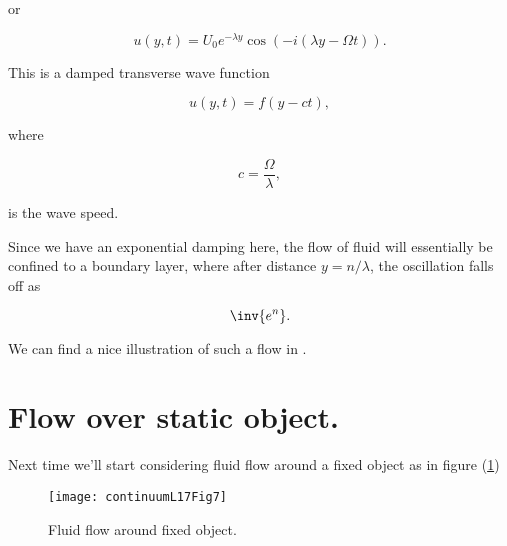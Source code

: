 or

\begin{equation}\label{eqn:continuumL17:580}
u(y, t) = 
U_0 e^{-\lambda y} \cos\left( -i (\lambda y - \Omega t) \right).
\end{equation}

This is a damped transverse wave function

\begin{equation}\label{eqn:continuumL17:600}
u(y, t) = f(y - c t),
\end{equation}

where 

\begin{equation}\label{eqn:continuumL17:620}
c = \frac{\Omega}{\lambda},
\end{equation}

is the wave speed.

Since we have an exponential damping here, the flow of fluid will essentially be confined to a boundary layer, where after distance $y = n/\lambda$, the oscillation falls off as

\begin{equation}\label{eqn:continuumL17:640}
\inv{e^n}.
\end{equation}

We can find a nice illustration of such a flow in \cite{wiki:StokesBoundary}.

\section{Flow over static object.}

Next time we'll start considering fluid flow around a fixed object as in figure (\ref{fig:continuumL17:continuumL17Fig7})

\begin{figure}[htp]
   \centering
   \texttt{[image: continuumL17Fig7]}
   \caption{Fluid flow around fixed object.}\label{fig:continuumL17:continuumL17Fig7}
\end{figure}


\EndArticle
